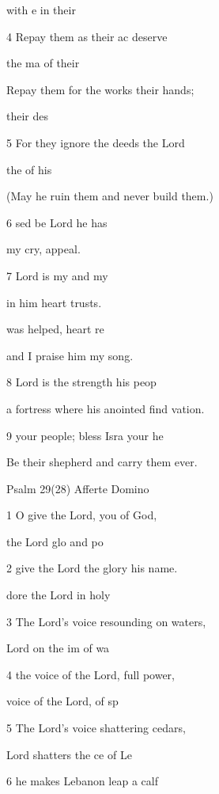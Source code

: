  with e in their  

4 Repay them as their ac deserve 

 the ma of their  

Repay them for the works  their hands; 

  their des 

5 For they ignore the deeds  the Lord 

 the  of his  

(May he ruin them and never build them.) 

6 sed be Lord  he has  

my cry,  appeal. 

7  Lord is my  and my  

in him  heart trusts. 

 was helped,  heart re 

and I praise him  my song. 

8  Lord is the strength  his peop 

a fortress where his anointed find vation. 

9  your people; bless Isra your he 

Be their shepherd and carry them  ever. 

Psalm 29(28) Afferte Domino 


1 O give the Lord, you  of God, 

 the Lord glo and po 

2 give the Lord the glory  his name. 

dore the Lord in  holy  

3 The Lord's voice resounding on  waters, 

 Lord on the im of wa 

4 the voice of the Lord, full  power, 

 voice of the Lord,  of sp 

5 The Lord's voice shattering  cedars, 

 Lord shatters the ce of Le 

6 he makes Lebanon leap  a calf 

